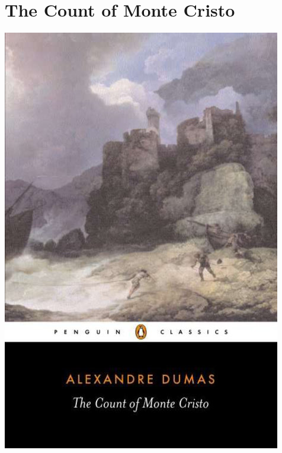 \documentclass{tufte-handout}
\makeatletter
\newcommand{\varcaption}[2][0pt]{%
  \gsetlength{\@tufte@caption@vertical@offset}{-#1}%
  \gdef\@tufte@stored@varcaption{#2}%
}
\gdef\@tufte@stored@varcaption{} %
\makeatother
\begin{document}
\section*{The Count of Monte Cristo}
\begin{marginfigure}[9\baselineskip]
   \includegraphics[width=\linewidth]{images/count_of_monte_cristo.jpg}
   \varcaption{\href{https://www.penguinrandomhouse.com/books/286345/the-count-of-monte-cristo-by-alexandre-dumas-pere/}{Publisher Link}, \href{https://www.amazon.com/Count-Monte-Cristo-Penguin-Classics/dp/0140449264/}{Amazon Link}}
\end{marginfigure}
\end{document}
